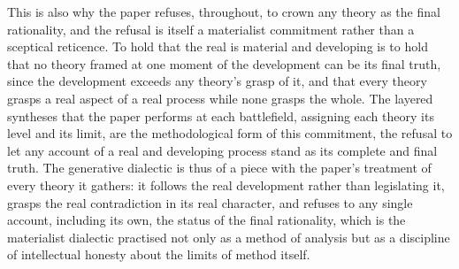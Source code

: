 This is also why the paper refuses, throughout, to crown any theory as the final rationality, and the refusal is itself a materialist commitment rather than a sceptical reticence. To hold that the real is material and developing is to hold that no theory framed at one moment of the development can be its final truth, since the development exceeds any theory's grasp of it, and that every theory grasps a real aspect of a real process while none grasps the whole. The layered syntheses that the paper performs at each battlefield, assigning each theory its level and its limit, are the methodological form of this commitment, the refusal to let any account of a real and developing process stand as its complete and final truth. The generative dialectic is thus of a piece with the paper's treatment of every theory it gathers: it follows the real development rather than legislating it, grasps the real contradiction in its real character, and refuses to any single account, including its own, the status of the final rationality, which is the materialist dialectic practised not only as a method of analysis but as a discipline of intellectual honesty about the limits of method itself.
